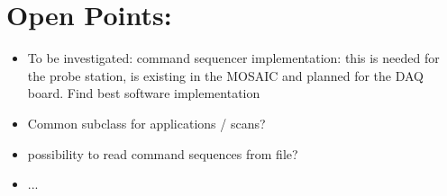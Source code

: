 \documentclass{article}
\let\oldsection\section
\renewcommand\section{\clearpage\oldsection}
\begin{document}
\section {Open Points:} 

\begin {itemize}
\item To be investigated: command sequencer implementation: this
  is needed for the probe station, is existing in the MOSAIC and
  planned for the DAQ board. Find best software implementation
\item Common subclass for applications / scans? 
\item possibility to read command sequences from file?
\item ...
\end{itemize}
\end{document}
